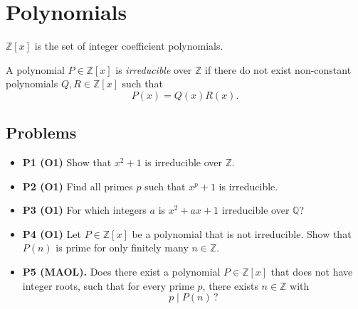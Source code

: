 \documentclass{article}
\begin{document}
	
	\section*{Polynomials}
	
	$\mathbb{Z}[x]$ is the set of integer coefficient polynomials.
	
	A polynomial $P \in \mathbb{Z}[x]$ is \emph{irreducible} over $\mathbb{Z}$ if there do not exist non-constant polynomials $Q, R \in \mathbb{Z}[x]$ such that
	\[
	P(x) = Q(x)R(x).
	\]
	
	\subsection*{Problems}
	
	\begin{itemize}
		\item \textbf{P1 (O1)} Show that $x^2 + 1$ is irreducible over $\mathbb{Z}$.
		
		\item \textbf{P2 (O1)} Find all primes $p$ such that $x^p + 1$ is irreducible.
		
		\item \textbf{P3 (O1)} For which integers $a$ is $x^2 + ax + 1$ irreducible over $\mathbb{Q}$?
		
		\item \textbf{P4 (O1)} Let $P \in \mathbb{Z}[x]$ be a polynomial that is not irreducible. Show that $P(n)$ is prime for only finitely many $n \in \mathbb{Z}$.
		
		\item \textbf{P5 (MAOL).} Does there exist a polynomial $P \in \mathbb{Z}[x]$ that does not have integer roots, such that for every prime $p$, there exists $n \in \mathbb{Z}$ with
		\[
		p \mid P(n)\,?
		\]
	\end{itemize}
	
\end{document}
